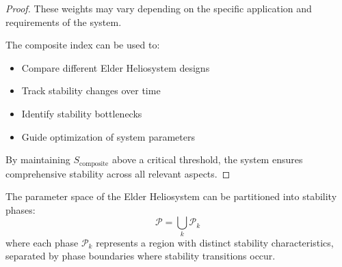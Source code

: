 \begin{proof}
These weights may vary depending on the specific application and requirements of the system.

The composite index can be used to:
\begin{itemize}
    \item Compare different Elder Heliosystem designs
    \item Track stability changes over time
    \item Identify stability bottlenecks
    \item Guide optimization of system parameters
\end{itemize}

By maintaining $S_{\text{composite}}$ above a critical threshold, the system ensures comprehensive stability across all relevant aspects.
\end{proof}

\begin{theorem}
The parameter space of the Elder Heliosystem can be partitioned into stability phases:
\begin{equation}
\mathcal{P} = \bigcup_k \mathcal{P}_k
\end{equation}
where each phase $\mathcal{P}_k$ represents a region with distinct stability characteristics, separated by phase boundaries where stability transitions occur.
\end{theorem}

